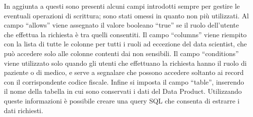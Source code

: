 \documentclass[12pt]{report}
\begin{document}
In aggiunta a questi sono presenti alcuni campi introdotti sempre per gestire le eventuali operazioni di scrittura; sono stati omessi in quanto non più utilizzati.  
Al campo ``allows'' viene assegnato il valore booleano ``true'' se il ruolo dell'utente che effettua la richiesta è tra quelli consentiti.
Il campo ``columns'' viene riempito con la lista di tutte le colonne per tutti i ruoli ad eccezione del data scientist, che può accedere solo alle colonne contenti dai non sensibili.
Il campo ``conditions'' viene utilizzato solo quando gli utenti che effettuano la richiesta hanno il ruolo di paziente o di medico, e serve a segnalare che possono accedere soltanto ai record con il corrispondente codice fiscale.
Infine si imposta il campo ``table'', inserendo il nome della tabella in cui sono conservati i dati del Data Product.
Utilizzando queste informazioni è possibile creare una query SQL che consenta di estrarre i dati richiesti.
\end{document}
